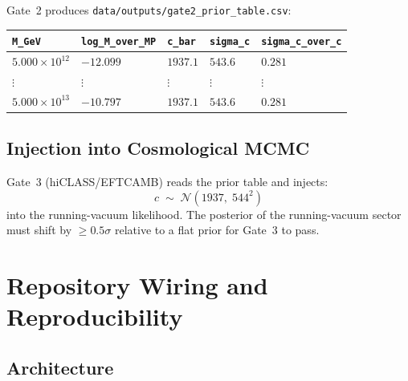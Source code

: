 \documentclass[11pt,a4paper]{article}
\theoremstyle{definition}
\theoremstyle{plain}
\theoremstyle{remark}
\begin{document}
Gate~2 produces \texttt{data/outputs/gate2\_prior\_table.csv}:
\begin{center}
\begin{tabular}{lllll}
  \toprule
  \texttt{M\_GeV} & \texttt{log\_M\_over\_MP} &
  \texttt{c\_bar} & \texttt{sigma\_c} & \texttt{sigma\_c\_over\_c} \\
  \midrule
  $5.000\times10^{12}$ & $-12.099$ & $1937.1$ & $543.6$ & $0.281$ \\
  $\vdots$ & $\vdots$ & $\vdots$ & $\vdots$ & $\vdots$ \\
  $5.000\times10^{13}$ & $-10.797$ & $1937.1$ & $543.6$ & $0.281$ \\
  \bottomrule
\end{tabular}
\end{center}

\subsection{Injection into Cosmological MCMC}

Gate~3 (hiCLASS/EFTCAMB) reads the prior table and injects:
\begin{equation}
  c \;\sim\; \mathcal{N}(1937,\;544^2)
  \label{eq:gate3_prior}
\end{equation}
into the running-vacuum likelihood.  The posterior of the
running-vacuum sector must shift by $\geq0.5\sigma$ relative to a flat
prior for Gate~3 to pass.


\section{Repository Wiring and Reproducibility}
\label{sec:implementation}

\subsection{Architecture}
\end{document}
